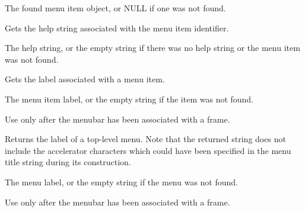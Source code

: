 The found menu item object, or NULL if one was not found.

\label{wxmenubargethelpstring}


Gets the help string associated with the menu item identifier.




The help string, or the empty string if there was no help string or the menu item
was not found.



\label{wxmenubargetlabel}


Gets the label associated with a menu item.




The menu item label, or the empty string if the item was not found.


Use only after the menubar has been associated with a frame.

\label{wxmenubargetlabeltop}


Returns the label of a top-level menu. Note that the returned string does not
include the accelerator characters which could have been specified in the menu
title string during its construction.




The menu label, or the empty string if the menu was not found.


Use only after the menubar has been associated with a frame.

